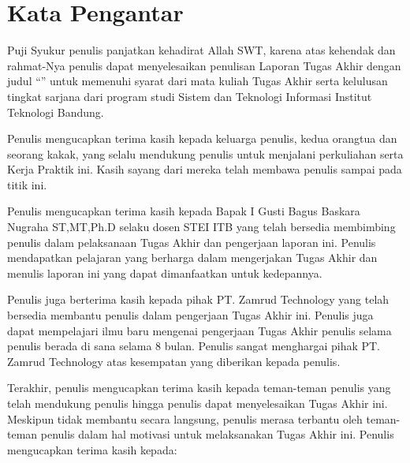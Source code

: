 \chapter*{Kata Pengantar}

Puji Syukur penulis panjatkan kehadirat Allah SWT, karena atas kehendak dan rahmat-Nya penulis dapat menyelesaikan penulisan Laporan Tugas Akhir dengan judul “\thetitle ” untuk memenuhi syarat dari mata kuliah Tugas Akhir serta kelulusan tingkat sarjana dari program studi Sistem dan Teknologi Informasi Institut Teknologi Bandung.

Penulis mengucapkan terima kasih kepada keluarga penulis, kedua orangtua dan seorang kakak, yang selalu mendukung penulis untuk menjalani perkuliahan serta Kerja Praktik ini. Kasih sayang dari mereka telah membawa penulis sampai pada titik ini.

Penulis mengucapkan terima kasih kepada Bapak I Gusti Bagus Baskara Nugraha ST,MT,Ph.D selaku dosen STEI ITB yang telah bersedia membimbing penulis dalam pelaksanaan Tugas Akhir dan pengerjaan laporan ini. Penulis mendapatkan pelajaran yang berharga dalam mengerjakan Tugas Akhir dan menulis laporan ini yang dapat dimanfaatkan untuk kedepannya.

Penulis juga berterima kasih kepada pihak PT. Zamrud Technology yang telah bersedia membantu penulis dalam pengerjaan Tugas Akhir ini. Penulis juga dapat mempelajari ilmu baru mengenai pengerjaan Tugas Akhir penulis selama penulis berada di sana selama 8 bulan. Penulis sangat menghargai pihak PT. Zamrud Technology atas kesempatan yang diberikan kepada penulis.

Terakhir, penulis mengucapkan terima kasih kepada teman-teman penulis yang telah mendukung penulis hingga penulis dapat menyelesaikan Tugas Akhir ini. Meskipun tidak membantu secara langsung, penulis merasa terbantu oleh teman-teman penulis dalam hal motivasi untuk melaksanakan Tugas Akhir ini. Penulis mengucapkan terima kasih kepada:

